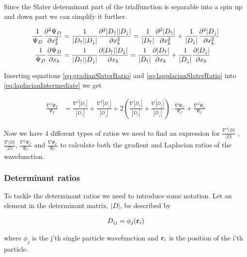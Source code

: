 \documentclass[x11names]{article}
\begin{document}
			Since the Slater determinant part of the trialfunction is separable into a spin up and down part we can simplify it further.

			\begin{align}
				\frac{1}{\Psi_D}\pdv[2]{\Psi_D}{x_k} &= \frac{1}{|D_\uparrow| |D_\downarrow|} \pdv[2]{ |D_\uparrow| |D_\downarrow| }{x_k}
				= \frac{1}{|D_\uparrow|} \pdv[2]{|D_\uparrow|}{x_k} + \frac{1}{|D_\downarrow|} \pdv[2]{|D_\downarrow|}{x_k} \label{eq:lapplacianSlaterRatio}
				\\
				\frac{1}{\Psi_D} \pdv{ \Psi_D }{x_k}  &=  \frac{1}{|D_\uparrow| |D_\downarrow|} \pdv{ |D_\uparrow| |D_\downarrow| }{x_k}
				= \frac{1}{|D_\uparrow|} \pdv{|D_\uparrow|}{x_k} + \frac{1}{|D_\downarrow|} \pdv{|D_\downarrow|}{x_k} \label{eq:gradianSlaterRatio}
			\end{align}

			Inserting equations \eqref{eq:gradianSlaterRatio} and \eqref{eq:lapplacianSlaterRatio} into \eqref{eq:laplacianIntermediate} we get

			\begin{align}
				\frac{\nabla^2 \Psi_T}{\Psi_T} &= \frac{\nabla^2 |D_\uparrow|}{|D_\uparrow|} + \frac{\nabla^2 |D_\downarrow|}{|D_\downarrow|} + 2 \left( \frac{\nabla |D_\uparrow|}{|D_\uparrow|} + \frac{\nabla |D_\downarrow|}{|D_\downarrow|} \right) \cdot \frac{\nabla\Psi_C}{\Psi_C} +  \frac{\nabla^2\Psi_C}{\Psi_C}  \label{eq:kineticRatio}
			\end{align}

			Now we have \(4\) different types of ratios we need to find an expression for \( \frac{\nabla^2 |D|}{|D|} \) , \(\frac{\nabla |D|}{|D|} \), \( \frac{\nabla^2\Psi_C}{\Psi_C} \) and \( \frac{\nabla\Psi_C}{\Psi_C} \) to calculate both the gradient and Laplacian ratios of the wavefunction.

			\subsubsection{Determinant ratios}
			To tackle the determinant ratios we need to introduce some notation. Let an element in the determinant matrix, \(|D|\),  be described by

			\begin{align}
				D_{ij} = \phi_j(\vb{r}_i)
			\end{align}

			where \(\phi_j\) is the j'th single particle wavefunction and \( \vb{r}_i \) is the position of the i'th particle.
\end{document}
